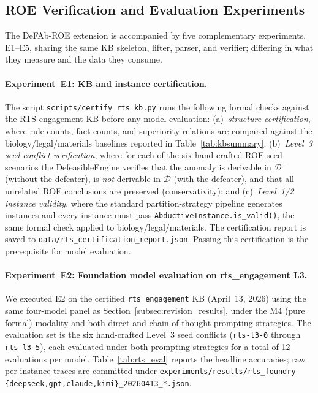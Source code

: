 \documentclass{article}
\theoremstyle{definition}
\newcommand{\D}{\mathcal{D}}
\begin{document}
\subsection{ROE Verification and Evaluation Experiments}\label{subsec:sc2live-experiments}

The DeFAb-ROE extension is accompanied by five complementary experiments, E1--E5, sharing the same KB skeleton, lifter, parser, and verifier; differing in what they measure and the data they consume.

\paragraph{Experiment~E1: KB and instance certification.} The script \texttt{scripts/certify\_rts\_kb.py} runs the following formal checks against the RTS engagement KB before any model evaluation: (a)~\emph{structure certification}, where rule counts, fact counts, and superiority relations are compared against the biology/legal/materials baselines reported in Table~\ref{tab:kbsummary}; (b)~\emph{Level~3 seed conflict verification}, where for each of the six hand-crafted ROE seed scenarios the DefeasibleEngine verifies that the anomaly is derivable in $\D^-$ (without the defeater), is \emph{not} derivable in $\D$ (with the defeater), and that all unrelated ROE conclusions are preserved (conservativity); and (c)~\emph{Level~1/2 instance validity}, where the standard partition-strategy pipeline generates instances and every instance must pass \texttt{AbductiveInstance.is\_valid()}, the same formal check applied to biology/legal/materials. The certification report is saved to \texttt{data/rts\_certification\_report.json}. Passing this certification is the prerequisite for model evaluation.

\paragraph{Experiment~E2: Foundation model evaluation on rts\_engagement L3.} We executed E2 on the certified \texttt{rts\_engagement} KB (April~13, 2026) using the same four-model panel as Section~\ref{subsec:revision_results}, under the M4 (pure formal) modality and both direct and chain-of-thought prompting strategies. The evaluation set is the six hand-crafted Level~3 seed conflicts (\texttt{rts-l3-0} through \texttt{rts-l3-5}), each evaluated under both prompting strategies for a total of 12 evaluations per model. Table~\ref{tab:rts_eval} reports the headline accuracies; raw per-instance traces are committed under \texttt{experiments/results/rts\_foundry-\{deepseek,gpt,claude,kimi\}\_20260413\_*.json}.
\end{document}
